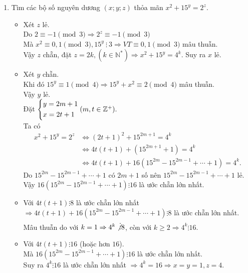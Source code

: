 \begin{ex}
{\begin{enumerate}
\begin{align*}
       \end{align*}
       Từ hai trường hợp ta có nghiệm của phương trình là $x=1, x=-3.$
        \item Tìm các bộ số nguyên dương $(x;y;z)$ thỏa mãn $x^2+15^y=2^z .$
        \begin{itemize}
        \item Xét $z$ lẻ.\\
        Do $2\equiv -1\pmod 3 \Rightarrow 2^z\equiv -1 \pmod 3$\\
        Mà $x^2 \equiv 0,1 \pmod 3, 15^y\  \vdots \ 3\Rightarrow VT\equiv 0,1 \pmod 3$ mâu thuẫn.\\
        Vậy $z$ chẵn, đặt $z = 2k, (k\in \mathbb{N}^*)\Rightarrow x^2 + 15^y =4^k$. Suy ra $x$ lẻ.
        \item Xét $y$ chẵn.\\
        Khi đó $15^y \equiv 1 \pmod 4 \Rightarrow 15^y + x^2 \equiv 2 \pmod 4$ mâu thuẫn.\\
        Vậy $y$ lẻ.\\ Đặt $\left\{\begin{aligned}&y=2m+1\\&x=2t+1\end{aligned}\right. (m,t\in \mathbb{Z}^+).$\\
       Ta có  \begin{align*}
       x^2+15^y=2^z &\Leftrightarrow (2t+1)^2 + 15^{2m+1}=4^k\\
       &\Leftrightarrow 4t(t+1) + (15^{2m+1}+1) =4^k\\
       &\Leftrightarrow 4t(t+1) + 16(15^{2m} - 15^{2m-1} + \cdots +1)=4^k.
\end{align*}        
		Do $15^{2m} - 15^{2m-1} + \cdots +1$ có $2m+1$ số nên $15^{2m} - 15^{2m-1} + \cdots +1$ lẻ.\\
		 Vậy $16(15^{2m} - 15^{2m-1} + \cdots +1) \vdots 16$ là ước chẵn lớn nhất.
		 \item Với $4t(t+1)\vdots 8$ là ước chẵn lớn nhất $\Rightarrow 4t(t+1) + 16(15^{2m} - 15^{2m-1} + \cdots +1)\vdots 8$ là ước chẵn lớn nhất.\\
		 Mâu thuẫn do với $k=1\Rightarrow 4^k\not \vdots 8$, còn với $k\geq 2\Rightarrow 4^k \vdots 16$.
		 \item Với $4t(t+1)\vdots 16$ (hoặc hơn $16$).\\
		 Mà $16(15^{2m} - 15^{2m-1} + \cdots +1) \vdots 16$ là ước chẵn lớn nhất.\\
		  Suy ra $4^k \vdots 16$ là ước chẵn lớn nhất $\Rightarrow 4^k =16 \Rightarrow x=y =1, z =4$.
		 
        \end{itemize}

    \end{enumerate}
    }
\end{ex}
